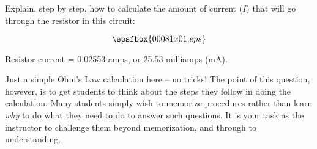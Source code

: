 

Explain, step by step, how to calculate the amount of current ($I$) that will go through the resistor in this circuit:

$$\epsfbox{00081x01.eps}$$







Resistor current = 0.02553 amps, or 25.53 milliamps (mA).







Just a simple Ohm's Law calculation here -- no tricks!  The point of this question, however, is to get students to think about the steps they follow in doing the calculation.  Many students simply wish to memorize procedures rather than learn {\it why} to do what they need to do to answer such questions.  It is your task as the instructor to challenge them beyond memorization, and through to understanding.




